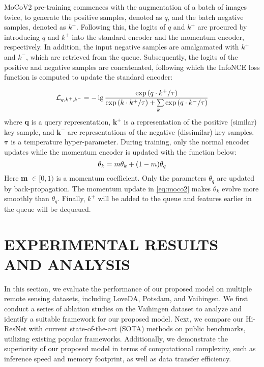 \documentclass[journal]{IEEEtran}
\begin{document}
MoCoV2 pre-training commences with the augmentation of a batch of images twice, to generate the positive samples, denoted as $q$, and the batch negative samples, denoted as $k^{+}$. Following this, the logits of $q$ and $k^{+}$ are procured by introducing $q$ and $k^{+}$ into the standard encoder and the momentum encoder, respectively. In addition, the input negative samples are amalgamated with $k^{+}$ and $k^{-}$, which are retrieved from the queue. Subsequently, the logits of the positive and negative samples are concatenated, following which the InfoNCE loss function is computed to update the standard encoder:

\begin{equation}
\small
    \mathcal{L}_{q, k^{+}, {k^{-}}} = -\lg \frac{\exp{(q\cdot k^{+} / \tau)}}{\exp{(k\cdot k^{+} / \tau)} + \sum\limits_{k^{-}}\exp{(q\cdot k^{-} / \tau)}}  
\label{eq:moco1}
\end{equation}
where \textbf{q} is a query representation, $\bm k^{+}$ is a representation of the positive (similar) key sample, and $\bm k^{-}$ are representations of the negative (dissimilar) key samples. $\bm \tau$ is a temperature hyper-parameter. During training, only the normal encoder updates while the momentum encoder is updated with the function below:
\begin{equation}
\small
    \mathcal{\theta}_{k} = m\theta_{k} + (1 - m)\theta_{q}
\label{eq:moco2}
\end{equation}
Here \textbf{m} $\in [0, 1)$ is a momentum coefficient. Only the parameters $\theta_{q}$ are updated by back-propagation. The momentum update in \ref{eq:moco2} makes $\theta_{k}$ evolve more smoothly than $\theta_{q}$. Finally, $k^{+}$ will be added to the queue and features earlier in the queue will be dequeued.

\section{EXPERIMENTAL RESULTS AND ANALYSIS}
In this section, we evaluate the performance of our proposed model on multiple remote sensing datasets, including LoveDA, Potsdam, and Vaihingen. We first conduct a series of ablation studies on the Vaihingen dataset to analyze and identify a suitable framework for our proposed model. Next, we compare our Hi-ResNet with current state-of-the-art (SOTA) methods on public benchmarks, utilizing existing popular frameworks. Additionally, we demonstrate the superiority of our proposed model in terms of computational complexity, such as inference speed and memory footprint, as well as data transfer efficiency.
\end{document}
